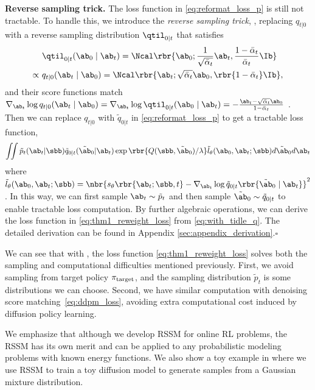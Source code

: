     \textbf{Reverse sampling trick.} The loss function in \eqref{eq:reformat_loss_p} is still not tractable. To handle this, we introduce the \emph{reverse sampling trick}, \ie, replacing $q_{t|0}$ with a reverse sampling distribution $\qtil_{0|t}$ that satisfies
    \begin{equation}
        \begin{aligned}
        &\qtil_{0|t}(\ab_0\mid \ab_t) =\Ncal\rbr{\ab_0;\frac{1}{\sqrt{\bar\alpha_t}}\ab_t, \frac{1 - \bar\alpha_t}{\bar\alpha_t}\Ib}\\
        \propto~& q_{t|0}(\ab_t\mid \ab_0) = \Ncal\rbr{\ab_t;\sqrt{\bar\alpha_t}\ab_0, \rbr{1 - \bar\alpha_t}\Ib},
    \end{aligned}\label{eq:reverse_gaussian}
    \end{equation}
    and their score functions match
    {
    \small
    $
    \nabla_{\ab_t}\log q_{t|0}(\ab_t\mid \ab_0) = \nabla_{\ab_t}\log \qtil_{0|t}(\ab_0\mid \ab_t) = - \frac{\ab_t -\sqrt{\bar\alpha_t}\ab_0}{1 -\bar\alpha_t}
    $
    }.
    Then we can replace $q_{t|0}$ with $\tilde q_{0|t}$ in \eqref{eq:reformat_loss_p} to get a tractable loss function,
    {
                \begin{equation}
        \iint \tilde p_t(\ab_t|\sbb)\tilde q_{0|t}(\tilde\ab_0| \ab_t)\exp\rbr{Q(\sbb,\tilde\ab_0)/\lambda} \tilde l_\theta(\ab_0,\ab_t;\sbb)d\tilde\ab_0d\ab_t \label{eq:with_tidle_q}
    \end{equation}
    }
where {\small $\tilde l_\theta(\ab_0,\ab_t;\sbb)  =  \nbr{s_\theta\rbr{\ab_t;\sbb, t}  -  \nabla_{\ab_t}\log \tilde q_{0|t}\rbr{\tilde\ab_0  \mid  \ab_t}}^2$}.
In this way, we can first sample $\ab_t\sim\tilde p_t$ and then sample $\tilde\ab_0\sim\tilde q_{0|t}$ to enable tractable loss computation.    
By further algebraic operations, we can derive the loss function in \eqref{eq:thm1_reweight_loss} from \eqref{eq:with_tidle_q}. The detailed derivation can be found in Appendix \ref{sec:appendix_derivation}.\hfill$\square$

We can see that with , the loss function \eqref{eq:thm1_reweight_loss} solves both the sampling and computational difficulties mentioned previously. First, we avoid sampling from target policy $\pi_{\rm target}$, and the sampling distribution $\tilde p_t$ is some distributions we can choose. Second, we have similar computation with denoising score matching~\eqref{eq:ddpm_loss}, avoiding extra computational cost induced by diffusion policy learning.


\begin{remark} We emphasize that although we develop RSSM for online RL problems, the RSSM has its own merit and can be applied to any probabilistic modeling problems with known energy functions. We also show a toy example in  where we use RSSM to train a toy diffusion model to generate samples from a Gaussian mixture distribution.
\end{remark}

